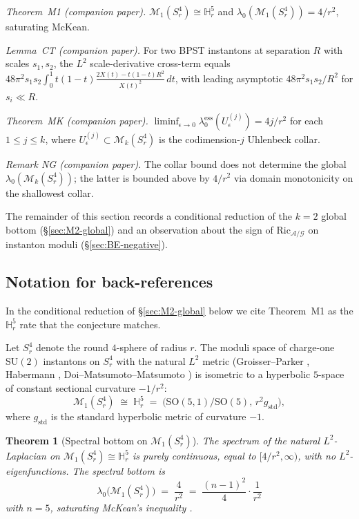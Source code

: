 \documentclass[11pt,letterpaper]{article}
\newtheorem{theorem}{Theorem}[section]
\theoremstyle{definition}
\newcommand{\bbH}{\mathbb{H}}
\newcommand{\cA}{\mathcal{A}}
\newcommand{\cG}{\mathcal{G}}
\newcommand{\cM}{\mathcal{M}}
\begin{document}
\medskip
\noindent\textit{Theorem~M1 (companion paper).} $\cM_1(S^4_r) \cong \bbH^5_r$ and $\lambda_0(\cM_1(S^4_r)) = 4/r^2$, saturating McKean.

\smallskip
\noindent\textit{Lemma~CT (companion paper).} For two BPST instantons at separation $R$ with scales $s_1, s_2$, the $L^2$ scale-derivative cross-term equals $48\pi^2 s_1 s_2 \int_0^1 t(1-t)\frac{2X(t)-t(1-t)R^2}{X(t)^2}\,dt$, with leading asymptotic $48\pi^2 s_1 s_2/R^2$ for $s_i \ll R$.

\smallskip
\noindent\textit{Theorem~MK (companion paper).} $\liminf_{\epsilon\to 0}\lambda_0^{\mathrm{ess}}(U_\epsilon^{(j)}) = 4j/r^2$ for each $1 \le j \le k$, where $U_\epsilon^{(j)} \subset \cM_k(S^4_r)$ is the codimension-$j$ Uhlenbeck collar.

\smallskip
\noindent\textit{Remark NG (companion paper).} The collar bound does not determine the global $\lambda_0(\cM_k(S^4_r))$; the latter is bounded above by $4/r^2$ via domain monotonicity on the shallowest collar.

\medskip
The remainder of this section records a conditional reduction of the $k = 2$ global bottom (\S\ref{sec:M2-global}) and an observation about the sign of $\mathrm{Ric}_{\cA/\cG}$ on instanton moduli (\S\ref{sec:BE-negative}).

\subsection*{Notation for back-references}

In the conditional reduction of \S\ref{sec:M2-global} below we cite Theorem~M1 as the $\bbH^5_r$ rate that the conjecture matches.



\iffalse
Let $S^4_r$ denote the round $4$-sphere of radius $r$. The moduli space of charge-one $\mathrm{SU}(2)$ instantons on $S^4_r$ with the natural $L^2$ metric (Groisser--Parker \cite{GP1987,GP1989}, Habermann \cite{Habermann1993}, Doi--Matsumoto--Matsumoto \cite{DMM1987}) is isometric to a hyperbolic $5$-space of constant sectional curvature $-1/r^2$:
\[
\cM_1(S^4_r) \;\cong\; \bbH^5_r \;=\; \bigl(\mathrm{SO}(5,1)/\mathrm{SO}(5),\, r^2 g_{\mathrm{std}}\bigr),
\]
where $g_{\mathrm{std}}$ is the standard hyperbolic metric of curvature $-1$.

\begin{theorem}[Spectral bottom on $\cM_1(S^4_r)$]\label{thm:M1-spectrum}
The spectrum of the natural $L^2$-Laplacian on $\cM_1(S^4_r)\cong\bbH^5_r$ is purely continuous, equal to $[4/r^2,\infty)$, with no $L^2$-eigenfunctions. The spectral bottom is
\[
\lambda_0\bigl(\cM_1(S^4_r)\bigr) \;=\; \frac{4}{r^2} \;=\; \frac{(n-1)^2}{4} \cdot \frac{1}{r^2}
\]
with $n=5$, saturating McKean's inequality \cite{McKean1970}.
\end{theorem}
\end{document}
